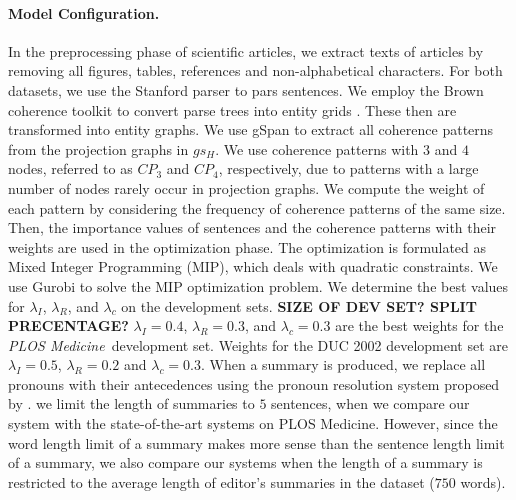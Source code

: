 \paragraph{Model Configuration. }
In the preprocessing phase of scientific articles, we extract texts of articles by removing all figures, tables, references and \mbox{non-alphabetical} characters.
For both datasets, we use the Stanford parser \cite{klein03b} to  pars sentences. 
We employ the Brown coherence toolkit \cite{elsner11b} to convert  parse trees into entity grids \cite{barzilay08}. 
These then are transformed into entity graphs. 
We use gSpan \cite{yanxifeng02} to extract all coherence patterns from the projection graphs in $gs_H$. 
We use coherence patterns with $3$ and $4$ nodes, referred to as $CP_3$ and $CP_4$, respectively, due to patterns with a large number of nodes rarely occur in projection graphs.
We compute the weight of each pattern by considering the frequency of coherence patterns of the same size. 
Then, the importance values of sentences and the coherence patterns with their weights are used in the optimization phase. 
The optimization is formulated as Mixed Integer Programming (MIP), which deals with quadratic constraints. 
We use Gurobi \cite{gurobi14} to solve the MIP optimization problem.
We determine the best values for $\lambda_{I}$, $\lambda_R$, and $\lambda_{c}$ on the development sets.
\textbf{SIZE OF DEV SET? SPLIT PRECENTAGE?}
$\lambda_{I}=0.4$, $\lambda_R=0.3$, and $\lambda_{c}=0.3$ are the best weights for the \emph{PLOS Medicine}\ development set. Weights for the DUC 2002 development set are $\lambda_{I}=0.5$, $\lambda_R=0.2$ and $\lambda_{c}=0.3$.
When a summary is produced, we replace all pronouns with their antecedences using the pronoun resolution system proposed by . 
we limit the length of summaries to $5$ sentences,  when we compare our system with the state-of-the-art systems on PLOS Medicine. 
However, since the word length limit of a summary makes more sense than the sentence length limit of a summary, we also compare our systems when the length of a summary is restricted to the average length of editor's summaries in the dataset ($750$ words). 
                                                                                       


